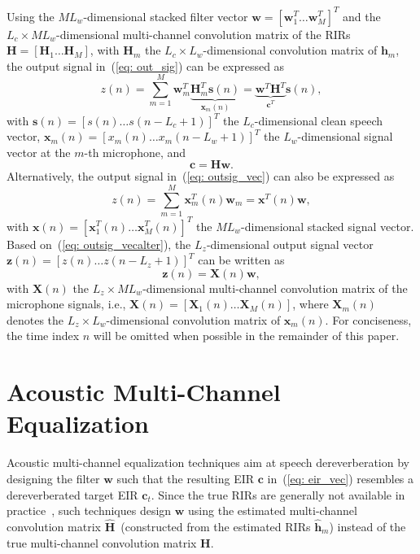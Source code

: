 \documentclass{article}
\begin{document}
Using the $ML_w$-dimensional stacked filter vector $\mathbf{w} = [\mathbf{w}^T_1 \ldots  \mathbf{w}^T_M]^T$ and the $L_c \times ML_w$-dimensional multi-channel convolution matrix of the RIRs $\mathbf{H} = [\mathbf{H}_1 \ldots \mathbf{H}_M]$, with $\mathbf{H}_m$ the $L_c \times L_w$-dimensional convolution matrix of $\mathbf{h}_m$, the output signal in~(\ref{eq: out_sig}) can be expressed as
\begin{equation}
\label{eq: outsig_vec}
z(n) = \sum_{m=1}^M \mathbf{w}_m^T\underbrace{\mathbf{H}^T_m\mathbf{s}(n)}_{\mathbf{x}_m(n)} = \underbrace{\mathbf{w}^T\mathbf{H}^T}_{\mathbf{c}^T}\mathbf{s}(n),
\end{equation}
with $\mathbf{s}(n) = [s(n) \ldots s(n-L_c+1)]^T$ the $L_c$-dimensional clean speech vector, $\mathbf{x}_m(n) = [x_m(n) \ldots x_m(n-L_w+1)]^T$ the $L_w$-dimensional signal vector at the $m$-th microphone, and
\begin{equation}
\label{eq: eir_vec}
\mathbf{c} = \mathbf{H}\mathbf{w}.
\end{equation}
Alternatively, the output signal in~(\ref{eq: outsig_vec}) can also be expressed as
\begin{equation}
\label{eq: outsig_vecalter}
z(n) = \sum_{m=1}^M \mathbf{x}_m^T(n)\mathbf{w}_m = \mathbf{x}^T(n)\mathbf{w},
\end{equation}
with $\mathbf{x}(n) = [\mathbf{x}^T_1(n) \ldots \mathbf{x}^T_M(n)]^T$ the $ML_w$-dimensional stacked signal vector.
Based on~(\ref{eq: outsig_vecalter}), the $L_z$-dimensional output signal vector $\mathbf{z}(n) = [z(n) \ldots z(n-L_z+1)]^T$ can be written as
\begin{equation}
\mathbf{z}(n) = \mathbf{X}(n)\mathbf{w},
\end{equation}
with $\mathbf{X}(n)$ the $L_z \times ML_w$-dimensional multi-channel convolution matrix of the microphone signals, i.e.,  $ \mathbf{X}(n) = [\mathbf{X}_1(n) \ldots \mathbf{X}_M(n)]$, where $\mathbf{X}_m(n)$ denotes the $L_z\times L_w$-dimensional convolution matrix of $\mathbf{x}_m(n)$.
For conciseness, the time index $n$ will be omitted when possible in the remainder of this paper.

\section{Acoustic Multi-Channel Equalization}

\label{sec: equalization}
Acoustic multi-channel equalization techniques aim at speech dereverberation by designing the filter $\mathbf{w}$ such that the resulting EIR $\mathbf{c}$ in~(\ref{eq: eir_vec}) resembles a dereverberated target EIR $\mathbf{c}_t$.
Since the true RIRs are generally not available in practice~\cite{Radlovic_ITSA_2000,Hasan_EUSIPCO_2006}, such techniques design $\mathbf{w}$ using the estimated multi-channel convolution matrix $\hat{\mathbf{H}}$~(constructed from the estimated RIRs $\hat{\mathbf{h}}_m$) instead of the true multi-channel convolution matrix $\mathbf{H}$.
\end{document}
